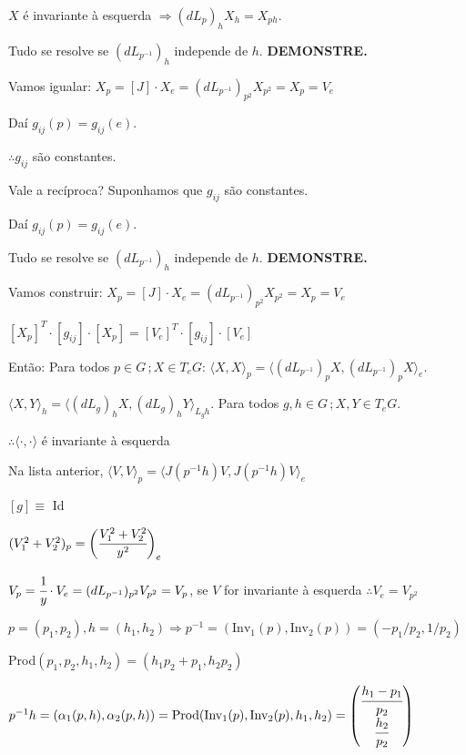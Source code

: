 \documentclass[10pt,a4paper]{article}
\begin{document}
		$X$ \'e invariante \`a esquerda $\Rightarrow (dL_p)_h X_h = X_{ph}$.

		Tudo se resolve se $(dL_{p^{-1}})_h$ independe de $h$. \textbf{DEMONSTRE.}

		Vamos igualar: $X_p = [J] \cdot X_e = (dL_{p^{-1}})_{p^2} X_{p^2} = X_p = V_e$

		Da\'i $g_{ij}(p) = g_{ij}(e)$.

		$\therefore g_{ij}$ s\~ao constantes.

		\vspace{3mm}

		Vale a rec\'iproca? Suponhamos que $g_{ij}$ s\~ao constantes.

		Da\'i $g_{ij}(p) = g_{ij}(e)$.

		Tudo se resolve se $(dL_{p^{-1}})_h$ independe de $h$. \textbf{DEMONSTRE.}

		Vamos construir: $X_p = [J] \cdot X_e = (dL_{p^{-1}})_{p^2} X_{p^2} = X_p = V_e$

		$[X_p]^T \cdot [g_{ij}] \cdot [X_p] = [V_e]^T \cdot [g_{ij}] \cdot [V_e]$

		Ent\~ao: Para todos $p \in G\,; X \in T_eG$: $\langle X, X \rangle_p = \langle (dL_{p^{-1}})_p X, (dL_{p^{-1}})_p X \rangle_e$.

		$\langle X, Y \rangle_h = \langle (dL_g)_h X, (dL_g)_h Y \rangle_{L_g h}$. Para todos $g,h \in G\,; X, Y \in T_eG$.

		$\therefore \langle \cdot, \cdot \rangle$ \'e invariante \`a esquerda

		\vspace{3mm}

		Na lista anterior, $\langle V, V\rangle_p = \langle J(p^{-1}h) V, J(p^{-1}h) V \rangle_e$

		$[g] \equiv$ Id

		$(V_1^2 + V_2^2)_p = \bigg( \cfrac{V_1^2 + V_2^2}{y^2} \bigg)_e$

		$V_p = \cfrac{1}{y} \cdot V_e = (dL_{p^{-1}})_{p^2} V_{p^2} = V_p$, se $V$ for invariante \`a esquerda $\therefore V_e = V_{p^2}$

		$p = (p_1,p_2), h = (h_1,h_2) \Rightarrow p^{-1} = (\text{Inv}_1(p), \text{Inv}_2(p)) = (-p_1/p_2, 1/p_2)$

		Prod$(p_1, p_2, h_1, h_2) = (h_1 p_2 + p_1, h_2 p_2)$

		$p^{-1}h = (\alpha_1(p,h), \alpha_2(p,h))	= \text{Prod}(\text{Inv}_1(p), \text{Inv}_2(p), h_1, h_2) = \left( \begin{matrix} \cfrac{h_1 - p_1}{p_2} \\ \cfrac{h_2}{p_2} \end{matrix} \right)$
\end{document}
